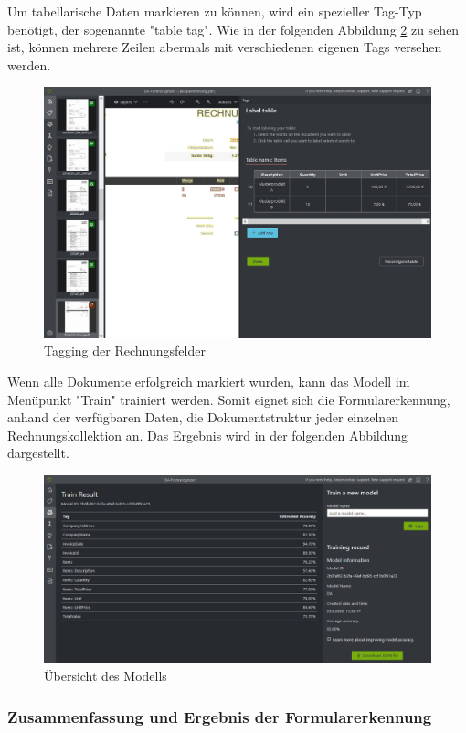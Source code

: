 Um tabellarische Daten markieren zu können, wird ein spezieller Tag-Typ benötigt, der sogenannte "table tag". Wie in der folgenden Abbildung 
\ref{fig:formrecognizer-invoice-tagging-items} zu sehen ist, können mehrere Zeilen abermals mit verschiedenen eigenen Tags versehen werden.

\begin{figure}[h]
    \centering
    \includegraphics[scale=0.4]{sections/cloud-computing/images/formrecognizer-invoice-tagging-items.PNG}
    \caption{Tagging der Rechnungsfelder}
    \label{fig:formrecognizer-invoice-tagging-items}
\end{figure}

Wenn alle Dokumente erfolgreich markiert wurden, kann das Modell im Menüpunkt "Train" trainiert werden. Somit eignet sich die Formularerkennung, anhand der 
verfügbaren Daten, die Dokumentstruktur jeder einzelnen Rechnungskollektion an. Das Ergebnis wird in der folgenden Abbildung dargestellt.

\begin{figure}[h]
    \centering
    \includegraphics[scale=0.4]{sections/cloud-computing/images/formrecognizer-model-overview.PNG}
    \caption{Übersicht des Modells}
    \label{fig:formrecognizer-invoice-tagging-items}
\end{figure}

\subsubsection{Zusammenfassung und Ergebnis der Formularerkennung}